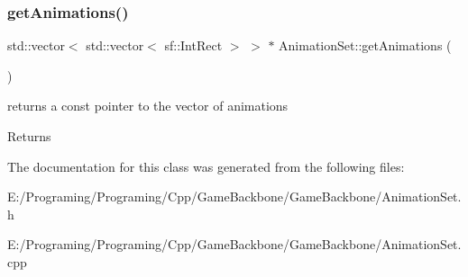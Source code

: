 \subsubsection{\texorpdfstring{get\+Animations()}{getAnimations()}}
{\footnotesize\ttfamily std\+::vector$<$ std\+::vector$<$ sf\+::\+Int\+Rect $>$ $>$ $\ast$ Animation\+Set\+::get\+Animations (\begin{DoxyParamCaption}{ }\end{DoxyParamCaption})}



returns a const pointer to the vector of animations 

\begin{DoxyReturn}{Returns}

\end{DoxyReturn}


The documentation for this class was generated from the following files\+:\begin{DoxyCompactItemize}
\item 
E\+:/\+Programing/\+Programing/\+Cpp/\+Game\+Backbone/\+Game\+Backbone/Animation\+Set.\+h\item 
E\+:/\+Programing/\+Programing/\+Cpp/\+Game\+Backbone/\+Game\+Backbone/Animation\+Set.\+cpp\end{DoxyCompactItemize}
